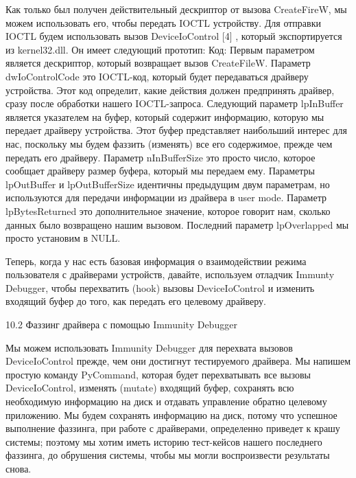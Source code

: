 \documentclass[12pt, a4paper, oneside]{book}
\begin{document}
Как только был получен действительный дескриптор от вызова CreateFireW, мы можем использовать его, чтобы передать IOCTL устройству. Для отправки IOCTL будем использовать вызов DeviceIoControl [4] , который экспортируется из kernel32.dll. Он имеет следующий прототип:
Код:
Первым параметром является дескриптор, который возвращает вызов CreateFileW. Параметр dwIoControlCode это IOCTL-код, который будет передаваться драйверу устройства. Этот код определит, какие действия должен предпринять драйвер, сразу после обработки нашего IOCTL-запроса. Следующий параметр lpInBuffer является указателем на буфер, который содержит информацию, которую мы передает драйверу устройства. Этот буфер представляет наибольший интерес для нас, поскольку мы будем фаззить (изменять) все его содержимое, прежде чем передать его драйверу. Параметр nInBufferSize это просто число, которое сообщает драйверу размер буфера, который мы передаем ему. Параметры lpOutBuffer и lpOutBufferSize идентичны предыдущим двум параметрам, но используются для передачи информации из драйвера в user mode. Параметр lpBytesReturned это дополнительное значение, которое говорит нам, сколько данных было возвращено нашим вызовом. Последний параметр lpOverlapped мы просто установим в NULL.

Теперь, когда у нас есть базовая информация о взаимодействии режима пользователя с драйверами устройств, давайте, используем отладчик Immunty Debugger, чтобы перехватить (hook) вызовы DeviceIoControl и изменить входящий буфер до того, как передать его целевому драйверу. 


10.2 Фаззинг драйвера с помощью Immunity Debugger

Мы можем использовать Immunity Debugger для перехвата вызовов DeviceIoControl прежде, чем они достигнут тестируемого драйвера. Мы напишем простую команду PyCommand, которая будет перехватывать все вызовы DeviceIoControl, изменять (mutate) входящий буфер, сохранять всю необходимую информацию на диск и отдавать управление обратно целевому приложению. Мы будем сохранять информацию на диск, потому что успешное выполнение фаззинга, при работе с драйверами, определенно приведет к крашу системы; поэтому мы хотим иметь историю тест-кейсов нашего последнего фаззинга, до обрушения системы, чтобы мы могли воспроизвести результаты снова.
\end{document}
